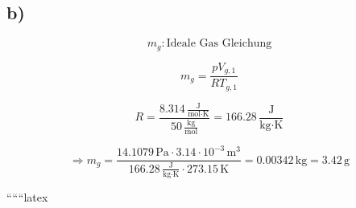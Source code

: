 

\subsection*{b)}

\[
m_g: \text{Ideale Gas Gleichung}
\]

\[
m_g = \frac{pV_{g,1}}{R T_{g,1}}
\]

\[
R = \frac{8.314 \, \frac{\text{J}}{\text{mol} \cdot \text{K}}}{50 \, \frac{\text{kg}}{\text{mol}}} = 166.28 \, \frac{\text{J}}{\text{kg} \cdot \text{K}}
\]

\[
\Rightarrow m_g = \frac{14.1079 \, \text{Pa} \cdot 3.14 \cdot 10^{-3} \, \text{m}^3}{166.28 \, \frac{\text{J}}{\text{kg} \cdot \text{K}} \cdot 273.15 \, \text{K}} = 0.00342 \, \text{kg} = 3.42 \, \text{g}
\]

``````latex